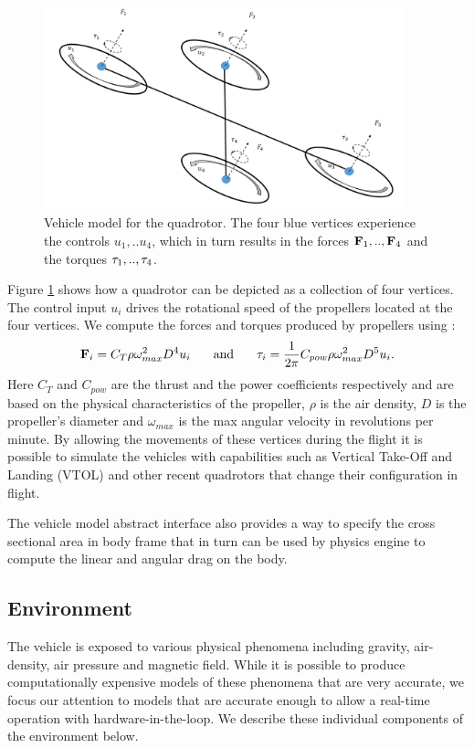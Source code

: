 \documentclass[graybox]{svmult}
\begin{document}
\begin{figure}[ttbp]
\includegraphics[width=0.93\textwidth]{forces.PNG}
\caption{Vehicle model for the quadrotor. The four blue vertices experience the controls $u_1, .. u_4$, which in turn results in the forces ${\bf F}_1, .., {\bf F}_4$ and the torques ${\bf \tau}_1, .., {\bf \tau}_4$.}
\label{fig:quad}
\end{figure}
Figure \ref{fig:quad} shows how a quadrotor can be depicted as a collection of four vertices. The control input $u_i$ drives the rotational speed of the propellers located at the four vertices. We compute the forces and torques produced by propellers using \cite{brandtuiuc}:
\begin{align*}
{\bf F}_i = C_T \rho \omega_{max}^2 D^4 u_i \mbox{\hspace{0.25in}and\hspace{0.25in}}
{\bf \tau}_i = \frac{1}{2\pi}C_{pow} \rho \omega_{max}^2 D^5 u_i.
\end{align*}
Here $C_T$ and $C_{pow}$ are the thrust and the power coefficients respectively and are based on the physical characteristics of the propeller, $\rho$ is the air density, $D$ is the propeller's diameter and $\omega_{max}$ is the max angular velocity in revolutions per minute. By allowing the movements of these vertices during the flight it is possible to simulate the vehicles with capabilities such as Vertical Take-Off and Landing  (VTOL) and other recent quadrotors that change their configuration in flight.

The vehicle model abstract interface also provides a way to specify the cross sectional area in body frame that in turn can be used by physics engine to compute the linear and angular drag on the body. 

\subsection{Environment}
The vehicle is exposed to various physical phenomena including gravity, air-density, air pressure and magnetic field. While it is possible to produce computationally expensive models of these phenomena that are very accurate, we focus our attention to models that are accurate enough to allow a real-time operation with hardware-in-the-loop. We describe these individual components of the environment below.
\end{document}
